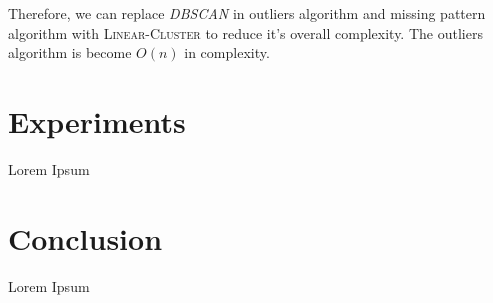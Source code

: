 \documentclass[conference]{IEEEtran}
\begin{document}
Therefore, we can replace \textit{DBSCAN} in outliers algorithm and missing pattern algorithm with \textsc{Linear-Cluster} to reduce it's overall complexity. The outliers algorithm is become $O(n)$ in complexity.


\section{Experiments}

Lorem Ipsum

\section{Conclusion}

Lorem Ipsum

\end{document}
